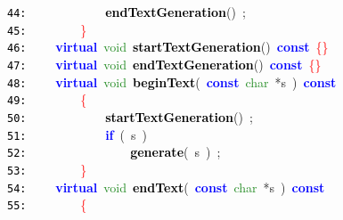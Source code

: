 \documentclass{article}
\begin{document}
\mbox{}\texttt{\textcolor{Black}{44:}} \ \ \ \ \ \ \ \ \ \ \ \ \textbf{\textcolor{Black}{endTextGeneration}}\textcolor{BrickRed}{()}\ \textcolor{BrickRed}{;} \\
\mbox{}\texttt{\textcolor{Black}{45:}} \ \ \ \ \ \ \ \ \textcolor{Red}{\}} \\
\mbox{}\texttt{\textcolor{Black}{46:}} \ \ \ \ \textbf{\textcolor{Blue}{virtual}}\ \textcolor{ForestGreen}{void}\ \textbf{\textcolor{Black}{\label{test.h:46}startTextGeneration}}\textcolor{BrickRed}{()}\ \textbf{\textcolor{Blue}{const}}\ \textcolor{Red}{\{\}} \\
\mbox{}\texttt{\textcolor{Black}{47:}} \ \ \ \ \textbf{\textcolor{Blue}{virtual}}\ \textcolor{ForestGreen}{void}\ \textbf{\textcolor{Black}{\label{test.h:47}endTextGeneration}}\textcolor{BrickRed}{()}\ \textbf{\textcolor{Blue}{const}}\ \textcolor{Red}{\{\}} \\
\mbox{}\texttt{\textcolor{Black}{48:}} \ \ \ \ \textbf{\textcolor{Blue}{virtual}}\ \textcolor{ForestGreen}{void}\ \textbf{\textcolor{Black}{\label{test.h:48}beginText}}\textcolor{BrickRed}{(}\ \textbf{\textcolor{Blue}{const}}\ \textcolor{ForestGreen}{char}\ \textcolor{BrickRed}{*}s\ \textcolor{BrickRed}{)}\ \textbf{\textcolor{Blue}{const}} \\
\mbox{}\texttt{\textcolor{Black}{49:}} \ \ \ \ \ \ \ \ \textcolor{Red}{\{} \\
\mbox{}\texttt{\textcolor{Black}{50:}} \ \ \ \ \ \ \ \ \ \ \ \ \textbf{\textcolor{Black}{startTextGeneration}}\textcolor{BrickRed}{()}\ \textcolor{BrickRed}{;} \\
\mbox{}\texttt{\textcolor{Black}{51:}} \ \ \ \ \ \ \ \ \ \ \ \ \textbf{\textcolor{Blue}{if}}\ \textcolor{BrickRed}{(}\ s\ \textcolor{BrickRed}{)} \\
\mbox{}\texttt{\textcolor{Black}{52:}} \ \ \ \ \ \ \ \ \ \ \ \ \ \ \ \ \textbf{\textcolor{Black}{generate}}\textcolor{BrickRed}{(}\ s\ \textcolor{BrickRed}{)}\ \textcolor{BrickRed}{;} \\
\mbox{}\texttt{\textcolor{Black}{53:}} \ \ \ \ \ \ \ \ \textcolor{Red}{\}} \\
\mbox{}\texttt{\textcolor{Black}{54:}} \ \ \ \ \textbf{\textcolor{Blue}{virtual}}\ \textcolor{ForestGreen}{void}\ \textbf{\textcolor{Black}{\label{test.h:54}endText}}\textcolor{BrickRed}{(}\ \textbf{\textcolor{Blue}{const}}\ \textcolor{ForestGreen}{char}\ \textcolor{BrickRed}{*}s\ \textcolor{BrickRed}{)}\ \textbf{\textcolor{Blue}{const}} \\
\mbox{}\texttt{\textcolor{Black}{55:}} \ \ \ \ \ \ \ \ \textcolor{Red}{\{} \\
\end{document}

